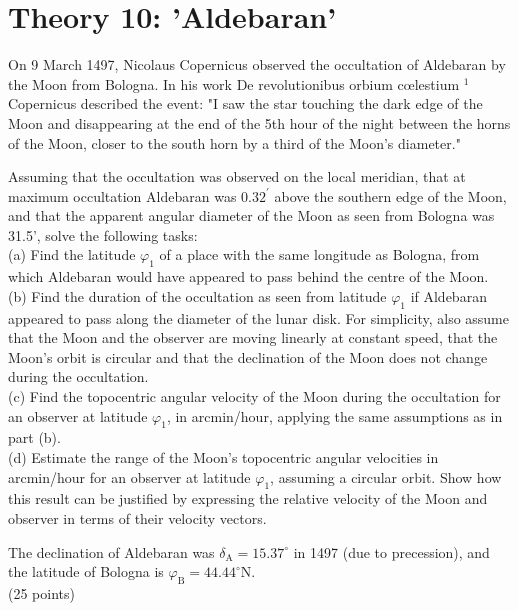 \documentclass[10pt]{article}
\begin{document}
\section*{Theory 10: 'Aldebaran'}
On 9 March 1497, Nicolaus Copernicus observed the occultation of Aldebaran by the Moon from Bologna. In his work De revolutionibus orbium cœlestium ${ }^{1}$ Copernicus described the event: "I saw the star touching the dark edge of the Moon and disappearing at the end of the 5th hour of the night between the horns of the Moon, closer to the south horn by a third of the Moon's diameter."

Assuming that the occultation was observed on the local meridian, that at maximum occultation Aldebaran was $0.32^{\prime}$ above the southern edge of the Moon, and that the apparent angular diameter of the Moon as seen from Bologna was 31.5', solve the following tasks:\\
(a) Find the latitude $\varphi_{1}$ of a place with the same longitude as Bologna, from which Aldebaran would have appeared to pass behind the centre of the Moon.\\
(b) Find the duration of the occultation as seen from latitude $\varphi_{1}$ if Aldebaran appeared to pass along the diameter of the lunar disk. For simplicity, also assume that the Moon and the observer are moving linearly at constant speed, that the Moon's orbit is circular and that the declination of the Moon does not change during the occultation.\\
(c) Find the topocentric angular velocity of the Moon during the occultation for an observer at latitude $\varphi_{1}$, in arcmin/hour, applying the same assumptions as in part (b).\\
(d) Estimate the range of the Moon's topocentric angular velocities in arcmin/hour for an observer at latitude $\varphi_{1}$, assuming a circular orbit. Show how this result can be justified by expressing the relative velocity of the Moon and observer in terms of their velocity vectors.

The declination of Aldebaran was $\delta_{\mathrm{A}}=15.37^{\circ}$ in 1497 (due to precession), and the latitude of Bologna is $\varphi_{\mathrm{B}}=44.44^{\circ} \mathrm{N}$.\\
(25 points)
\end{document}
